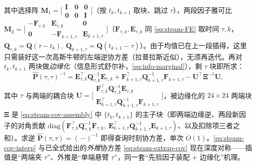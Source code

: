 其中选择阵 $\mathbf{M}_1=\big[\begin{smallmatrix}\mathbf{I}&\mathbf{0}&\mathbf{0}\\\mathbf{0}&\mathbf{0}&\mathbf{I}\end{smallmatrix}\big]$（按 $t_k,t_{k+1}$ 取块、跳过 $\tau$），两段因子雅可比 $\mathbf{M}_2=\big[\begin{smallmatrix}-\mathbf{F}_{\tau,k}&\mathbf{E}_{\tau,k}&\mathbf{0}\\\mathbf{0}&-\mathbf{F}_{k+1,\tau}&\mathbf{E}_{k+1,\tau}\end{smallmatrix}\big]$（$\mathbf{F}_{\tau,k},\mathbf{E}_{\tau,k}$ 同 \cref{eq:steam-FE} 取时间 $\tau,k$，$\mathbf{Q}_{\tau,k}=\mathbf{Q}(\tau-t_k),\ \mathbf{Q}_{k+1,\tau}=\mathbf{Q}(t_{k+1}-\tau)$）。由于均值已在上一段插得，这里只需装好这一次高斯牛顿的左端逆协方差（拉普拉斯近似），无须再迭代。再对 $t_k,t_{k+1}$ 两块做\emph{边缘化}（信息形式舒尔补，\cref{eq:info-marginal}），剩 $\tau$ 块即所求：
\begin{equation}
  \hat{\mathbf{P}}(\tau,\tau)^{-1}
  =\mathbf{E}_{\tau,k}^\top\mathbf{Q}_{\tau,k}^{-1}\mathbf{E}_{\tau,k}+\mathbf{F}_{k+1,\tau}^\top\mathbf{Q}_{k+1,\tau}^{-1}\mathbf{F}_{k+1,\tau}
  -\mathbf{U}^\top\boldsymbol{\Xi}^{-1}\mathbf{U},
  \label{eq:steam-cov-interp}
\end{equation}
其中 $\tau$ 与两端的耦合块 $\mathbf{U}=\big[\begin{smallmatrix}\mathbf{F}_{\tau,k}^\top\mathbf{Q}_{\tau,k}^{-1}\mathbf{E}_{\tau,k}\\\mathbf{E}_{k+1,\tau}^\top\mathbf{Q}_{k+1,\tau}^{-1}\mathbf{F}_{k+1,\tau}\end{smallmatrix}\big]$，被边缘化的 $24\times24$ 两端块 $\boldsymbol{\Xi}$ 是 \cref{eq:steam-cov-assembly} 中 $\{t_k,t_{k+1}\}$ 的主子块（即两端边缘逆、两段新因子的对角贡献 $\mathrm{diag}(\mathbf{F}_{\tau,k}^\top\mathbf{Q}_{\tau,k}^{-1}\mathbf{F}_{\tau,k},\ \mathbf{E}_{k+1,\tau}^\top\mathbf{Q}_{k+1,\tau}^{-1}\mathbf{E}_{k+1,\tau})$、以及扣除项三者之和）。求逆 $\hat{\mathbf{P}}(\tau,\tau)=(\,\cdots)^{-1}$ 即得查询时刻协方差，单次 $O(1)$。\cref{eq:steam-cov-interp} 与已全式给出的\emph{外推}协方差 \cref{eq:steam-extrap-cov} 现在深度对称——插值是“两端夹 $\tau$”、外推是“单端悬臂 $\tau$”，同一套“先验因子装配 $+$ 边缘化”机理。

